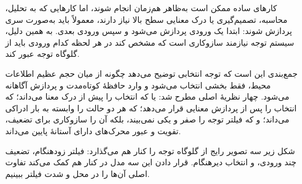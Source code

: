 کارهای ساده ممکن است به‌ظاهر هم‌زمان انجام شوند، اما کارهایی که به تحلیل، محاسبه، تصمیم‌گیری یا درک معنایی سطح بالا نیاز دارند، معمولاً باید به‌صورت سری پردازش شوند: ابتدا یک ورودی پردازش می‌شود و سپس ورودی بعدی. به همین دلیل، سیستم توجه نیازمند سازوکاری است که مشخص کند در هر لحظه کدام ورودی باید از گلوگاه توجه عبور کند.

جمع‌بندی این است که توجه انتخابی توضیح می‌دهد چگونه از میان حجم عظیم اطلاعات محیط، فقط بخشی انتخاب می‌شود و وارد حافظهٔ کوتاه‌مدت و پردازش آگاهانه می‌شود. چهار نظریهٔ اصلی مطرح شد:  یا  که انتخاب را پیش از درک معنا می‌داند؛  که انتخاب را پس از پردازش معنایی قرار می‌دهد؛  که هر دو حالت را وابسته به بار ادراکی می‌داند؛ و  که فیلتر توجه را صفر و یکی نمی‌بیند، بلکه آن را سازوکاری برای تضعیف، تقویت و عبور محرک‌های دارای آستانهٔ پایین می‌داند.

شکل زیر سه تصویر رایج از گلوگاه توجه را کنار هم می‌گذارد: فیلتر زودهنگام، تضعیف چند ورودی، و انتخاب دیرهنگام. قرار دادن این سه مدل در کنار هم کمک می‌کند تفاوت اصلی آن‌ها را در محل و شدت فیلتر ببینیم.

